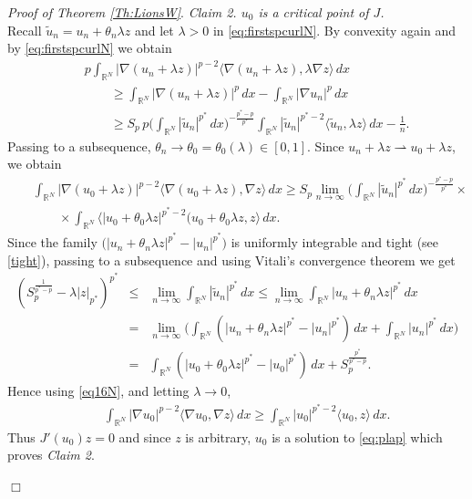 \documentclass[12pt,leqno,twoside]{amsart}
\newenvironment{altproof}[1]
{\noindent%
{\em Proof of {#1}}.}
{\nopagebreak\mbox{}\hfill $\Box$\par\addvspace{0.5cm}}
\newcommand{\wt}{\widetilde}
\def\R{\mathbb{R}}
\def\rh{\rightharpoonup}
\def\rh{\rightharpoonup}
\def\wt{\widetilde}
\numberwithin{equation}{section}
\begin{document}
\begin{altproof}{Theorem \ref{Th:LionsW}}
	{\em Claim 2. $u_0$ is a critical point of $J$.}\\
	Recall $\wt u_n = u_n+\theta_n\lambda z$ and let $\lambda>0$ in \eqref{eq:firstspcurlN}. By convexity again and by \eqref{eq:firstspcurlN} we obtain
	\begin{eqnarray*}
		&&p \int_{\R^N}|\nabla (u_n+\lambda z)|^{p-2}\langle \nabla (u_n+\lambda z),\lambda\nabla  z\rangle\,dx \\
		&& \qquad \geq \int_{\R^N}|\nabla (u_n+\lambda z)|^p\,dx-\int_{\R^N}|\nabla u_n|^p\,dx\\
		&&\qquad \geq S_{p} \, p\Big(\int_{\R^N}|\wt u_n|^{p^*}\,dx\Big)^{-\frac{p^*-p}{p^*}}\int_{\R^N}|\wt u_n|^{p^*-2}\langle \wt u_n, \lambda z\rangle \,dx-\frac{1}{n}.
	\end{eqnarray*}
	Passing to a subsequence, $\theta_n\to \theta_0=\theta_0(\lambda)\in [0,1]$. 
	Since $u_n+\lambda z\rh u_0+\lambda z$, we obtain
	\begin{eqnarray}
	&&\int_{\R^N}|\nabla (u_0+\lambda z)|^{p-2}\langle \nabla (u_0+\lambda z), \nabla  z\rangle\,dx 
	\ge S_{p} \lim_{n\to\infty}\Big(\int_{\R^N}|\wt u_n|^{p^*}\,dx\Big)^{-\frac{p^*-p}{p^*}} \label{eq16N} \times \\
	&& \qquad \times \int_{\R^N}\langle |u_0+\theta_0\lambda z|^{p^*-2}(u_0+\theta_0\lambda z, z\rangle \,dx. \nonumber
	\end{eqnarray} 
	Since
	the family $\big(|u_n+\theta_n\lambda z|^{p^*}-|u_n|^{p^*}\big)$  is uniformly integrable and tight (see \eqref{tight}),
passing to a subsequence and using Vitali's convergence theorem we get
	\begin{eqnarray*}
	\left(
S_{p}^{\frac{1}{p^*-p}}-\lambda|z|_{p^*}
\right)^{p^*}&\leq&		\lim_{n\to\infty}\int_{\R^N}|\wt u_n|^{p^*}\,dx \leq \lim_{n\to\infty}\int_{\R^N}|u_n+\theta_n\lambda z|^{p^*}\,dx \\ 
		&=& \lim_{n\to\infty} \Big(\int_{\R^N}(|u_n+\theta_n\lambda z|^{p^*}-|u_n|^{p^*})\,dx +\int_{\R^N}|u_n|^{p^*}\,dx \Big)  \\
		&=& \int_{\R^N}(|u_0+\theta_0\lambda z|^{p^*}-|u_0|^{p^*})\,dx + S_{p}^{\frac{p^*}{p^*-p}}.
	\end{eqnarray*}
	Hence using \eqref{eq16N},  
	and letting $\lambda\to 0$, 
	\begin{eqnarray*}
		&&\int_{\R^N}|\nabla u_0|^{p-2}\langle \nabla u_0,\nabla  z\rangle\,dx
		\geq \int_{\R^N}|u_0|^{p^*-2}\langle u_0,z\rangle \,dx.
	\end{eqnarray*}
	Thus $J'(u_0)z=0$ and since $z$ is arbitrary, $u_0$ is a solution to \eqref{eq:plap} which proves \emph{Claim 2}.
	

\end{altproof}
\end{document}
